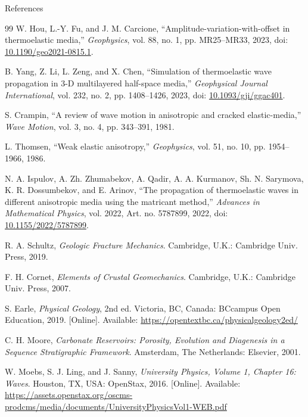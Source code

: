 \documentclass[aspectratio=169,10pt]{beamer}
\begin{document}
\begin{frame}[allowframebreaks]{References}
\begin{thebibliography}{99}
  W. Hou, L.-Y. Fu, and J. M. Carcione,
  ``Amplitude-variation-with-offset in thermoelastic media,''
  \textit{Geophysics}, vol. 88, no. 1, pp. MR25--MR33, 2023,
  doi: \href{https://doi.org/10.1190/geo2021-0815.1}{10.1190/geo2021-0815.1}.

  B. Yang, Z. Li, L. Zeng, and X. Chen,
  ``Simulation of thermoelastic wave propagation in 3-D multilayered half-space
  media,''
  \textit{Geophysical Journal International}, vol. 232, no. 2, pp. 1408--1426,
  2023, doi: \href{https://doi.org/10.1093/gji/ggac401}{10.1093/gji/ggac401}.

  S. Crampin,
  ``A review of wave motion in anisotropic and cracked elastic-media,''
  \textit{Wave Motion}, vol. 3, no. 4, pp. 343--391, 1981.

  L. Thomsen,
  ``Weak elastic anisotropy,''
  \textit{Geophysics}, vol. 51, no. 10, pp. 1954--1966, 1986.

  N. A. Ispulov, A. Zh. Zhumabekov, A. Qadir, A. A. Kurmanov,
  Sh. N. Sarymova, K. R. Dossumbekov, and E. Arinov,
  ``The propagation of thermoelastic waves in different anisotropic media using
  the matricant method,''
  \textit{Advances in Mathematical Physics}, vol. 2022, Art. no. 5787899, 2022,
  doi: \href{https://doi.org/10.1155/2022/5787899}{10.1155/2022/5787899}.

  R. A. Schultz,
  \textit{Geologic Fracture Mechanics}.
  Cambridge, U.K.: Cambridge Univ. Press, 2019.

  F. H. Cornet,
  \textit{Elements of Crustal Geomechanics}.
  Cambridge, U.K.: Cambridge Univ. Press, 2007.

  S. Earle,
  \textit{Physical Geology}, 2nd ed.
  Victoria, BC, Canada: BCcampus Open Education, 2019.
  [Online]. Available: \url{https://opentextbc.ca/physicalgeology2ed/}

  C. H. Moore,
  \textit{Carbonate Reservoirs: Porosity, Evolution and Diagenesis in a Sequence
  Stratigraphic Framework}.
  Amsterdam, The Netherlands: Elsevier, 2001.

  W. Moebs, S. J. Ling, and J. Sanny,
  \textit{University Physics, Volume 1, Chapter 16: Waves}.
  Houston, TX, USA: OpenStax, 2016.
  [Online]. Available:
  \url{https://assets.openstax.org/oscms-prodcms/media/documents/UniversityPhysicsVol1-WEB.pdf}


\end{thebibliography}
\end{frame}
\end{document}
